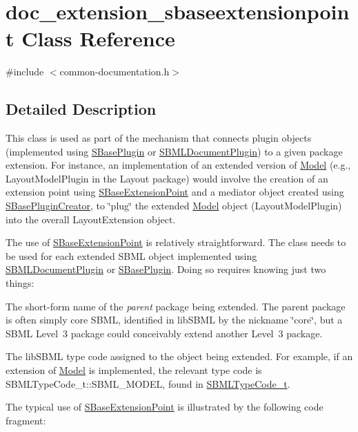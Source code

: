 \hypertarget{classdoc__extension__sbaseextensionpoint}{}\section{doc\+\_\+extension\+\_\+sbaseextensionpoint Class Reference}
\label{classdoc__extension__sbaseextensionpoint}


{\ttfamily \#include $<$common-\/documentation.\+h$>$}



\subsection{Detailed Description}
\begin{DoxyParagraph}{}
This class is used as part of the mechanism that connects plugin objects (implemented using \hyperlink{class_s_base_plugin}{S\+Base\+Plugin} or \hyperlink{class_s_b_m_l_document_plugin}{S\+B\+M\+L\+Document\+Plugin}) to a given package extension. For instance, an implementation of an extended version of \hyperlink{class_model}{Model} (e.\+g., Layout\+Model\+Plugin in the Layout package) would involve the creation of an extension point using \hyperlink{class_s_base_extension_point}{S\+Base\+Extension\+Point} and a mediator object created using \hyperlink{class_s_base_plugin_creator}{S\+Base\+Plugin\+Creator}, to \char`\"{}plug\char`\"{} the extended \hyperlink{class_model}{Model} object (Layout\+Model\+Plugin) into the overall Layout\+Extension object.
\end{DoxyParagraph}
The use of \hyperlink{class_s_base_extension_point}{S\+Base\+Extension\+Point} is relatively straightforward. The class needs to be used for each extended S\+B\+ML object implemented using \hyperlink{class_s_b_m_l_document_plugin}{S\+B\+M\+L\+Document\+Plugin} or \hyperlink{class_s_base_plugin}{S\+Base\+Plugin}. Doing so requires knowing just two things\+:

\begin{DoxyItemize}
\item The short-\/form name of the {\itshape parent} package being extended. The parent package is often simply core S\+B\+ML, identified in lib\+S\+B\+ML by the nickname {\ttfamily \char`\"{}core\char`\"{}}, but a S\+B\+ML Level~3 package could conceivably extend another Level~3 package.\end{DoxyItemize}
\begin{DoxyItemize}
\item The lib\+S\+B\+ML type code assigned to the object being extended. For example, if an extension of \hyperlink{class_model}{Model} is implemented, the relevant type code is S\+B\+M\+L\+Type\+Code\+\_\+t\+::\+S\+B\+M\+L\+\_\+\+M\+O\+D\+EL, found in \hyperlink{_s_b_m_l_type_codes_8h_aa283dddfd7671179362b2f38e2938cfe}{S\+B\+M\+L\+Type\+Code\+\_\+t}.\end{DoxyItemize}
The typical use of \hyperlink{class_s_base_extension_point}{S\+Base\+Extension\+Point} is illustrated by the following code fragment\+:


